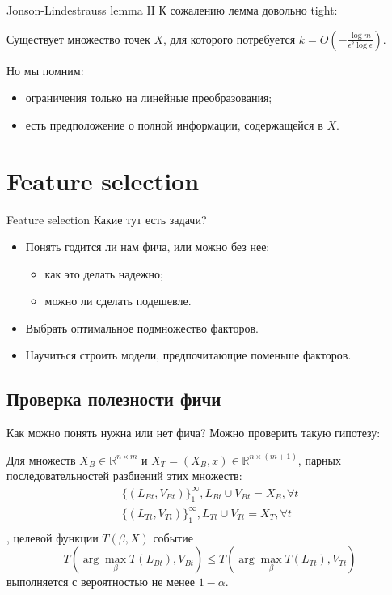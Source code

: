 \documentclass[14pt, fleqn, xcolor={dvipsnames, table}]{beamer}
\begin{document}
\begin{frame}{Jonson-Lindestrauss lemma II}
К сожалению лемма довольно tight:
\begin{theorem}{}
Существует множество точек $X$, для которого потребуется $k = O(-\frac{\log m}{\epsilon^2 \log \epsilon})$.
\end{theorem}
Но мы помним:
\begin{itemize}
  \item ограничения только на линейные преобразования;
  \item есть предположение о полной информации, содержащейся в $X$.
\end{itemize}
\end{frame}

\section{Feature selection}
\begin{frame}{Feature selection}
Какие тут есть задачи?
\begin{itemize}
  \item Понять годится ли нам фича, или можно без нее:
  \begin{itemize}
    \item как это делать надежно;
    \item можно ли сделать подешевле.
  \end{itemize}
  \item Выбрать оптимальное подмножество факторов.
  \item Научиться строить модели, предпочитающие поменьше факторов.
\end{itemize}
\end{frame}

\subsection{Проверка полезности фичи}
\begin{frame}{Как можно понять нужна или нет фича?}
Можно проверить такую гипотезу:
\begin{theorem}{}{} \small Для множеств $X_B \in \mathbb{R}^{n\times m}$ и $X_T = (X_B, x) \in \mathbb{R}^{n\times (m+1)}$, парных последовательностей разбиений этих множеств:
$$\begin{array}{l}
\{(L_{Bt}, V_{Bt})\}_1^{\infty}, L_{Bt} \cup V_{Bt} = X_B, \forall t\\
\{(L_{Tt}, V_{Tt})\}_1^{\infty}, L_{Tt} \cup V_{Tt} = X_T, \forall t\\
\end{array}$$
, целевой функции $T(\beta, X)$ событие
$$
T(\arg \max_{\beta} T(L_{Bt}), V_{Bt}) \le T(\arg \max_{\beta} T(L_{Tt}), V_{Tt})
$$
выполняется с вероятностью не менее $1 - \alpha$.
\end{theorem}
\end{frame}
\end{document}
